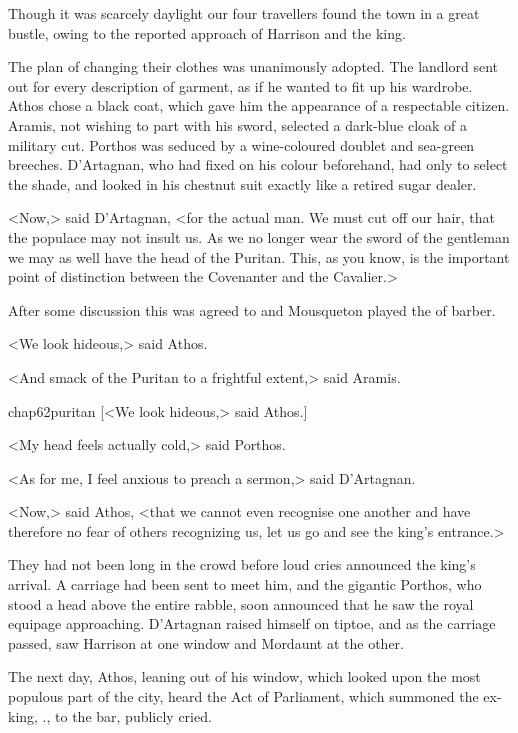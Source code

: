 Though it was scarcely daylight our four travellers found the town in a great bustle, owing to the reported approach of Harrison and the king.

The plan of changing their clothes was unanimously adopted. The landlord sent out for every description of garment, as if he wanted to fit up his wardrobe. Athos chose a black coat, which gave him the appearance of a respectable citizen. Aramis, not wishing to part with his sword, selected a dark-blue cloak of a military cut. Porthos was seduced by a wine-coloured doublet and sea-green breeches. D'Artagnan, who had fixed on his colour beforehand, had only to select the shade, and looked in his chestnut suit exactly like a retired sugar dealer.

<Now,> said D'Artagnan, <for the actual man. We must cut off our hair, that the populace may not insult us. As we no longer wear the sword of the gentleman we may as well have the head of the Puritan. This, as you know, is the important point of distinction between the Covenanter and the Cavalier.>

After some discussion this was agreed to and Mousqueton played the  of barber.

<We look hideous,> said Athos.

<And smack of the Puritan to a frightful extent,> said Aramis.

\begin{bwbigpic}
	[\basicscale] 
	{chap62puritan}
	[<We look hideous,> said Athos.]
\end{bwbigpic}

<My head feels actually cold,> said Porthos.

<As for me, I feel anxious to preach a sermon,> said D'Artagnan.

<Now,> said Athos, <that we cannot even recognise one another and have therefore no fear of others recognizing us, let us go and see the king's entrance.>

They had not been long in the crowd before loud cries announced the king's arrival. A carriage had been sent to meet him, and the gigantic Porthos, who stood a head above the entire rabble, soon announced that he saw the royal equipage approaching. D'Artagnan raised himself on tiptoe, and as the carriage passed, saw Harrison at one window and Mordaunt at the other.

The next day, Athos, leaning out of his window, which looked upon the most populous part of the city, heard the Act of Parliament, which summoned the ex-king, ., to the bar, publicly cried.

